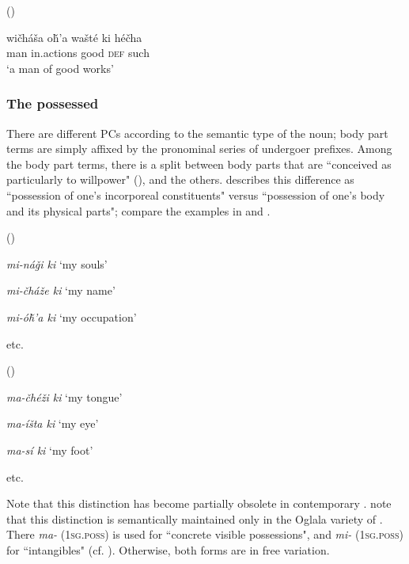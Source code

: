 \documentclass[output=paper]{LSP/langsci}
\begin{document}
\ea {} (\citealt[93]{Buechel1939}) \label{lakotagoodworks}

\gll wi\v{c}háša o\v{h}'a     wašté ki     hé\v{c}ha \\
man       in.actions good  \textsc{def} such \\
\glt `a man of good works'
\z

\subsubsection{The possessed}
There are different PCs according to the semantic type of the  noun; body part terms are simply affixed by the pronominal series of undergoer prefixes. Among the body part terms, there is a split between body parts that are ``conceived as particularly  to willpower" (\citealt[128]{BoasDeloria1941}), and the others. \citet[100]{Buechel1939} describes this difference as ``possession of one's incorporeal constituents" versus ``possession of one's body and its physical parts"; compare the examples in  and .

\ea {} (\citealt[101]{Buechel1939}) \label{lakotaincorporeal}

\textit{mi-ná\v{g}i ki } \hspace{2.1em}		`my souls'

\textit{mi-\v{c}há\v{z}e  ki } \hspace{1.9em} `my name'

\textit{mi-ó\v{h}'a ki}	\hspace{2em}		`my occupation'

etc.

\ex {} (\citealt[100]{Buechel1939}) \label{lakotabody}

\textit{ma-\v{c}hé\v{z}i ki } \hspace{1.7em}	`my tongue'

\textit{ma-íšta ki }	 \hspace{2.1em}	`my eye'

\textit{ma-sí ki }		 \hspace{3em}	`my foot'

etc.
\z

Note that this distinction has become partially obsolete in contemporary . \citet[458]{RoodTaylor1996} note that this distinction is semantically maintained only in the Oglala variety of . There \textit{ma-} (\textsc{1sg.poss}) is used for ``concrete visible possessions", and \textit{mi-} (\textsc{1sg.poss}) for ``intangibles" (cf. \citealt[458]{RoodTaylor1996}). Otherwise, both forms are in free variation.
\end{document}
